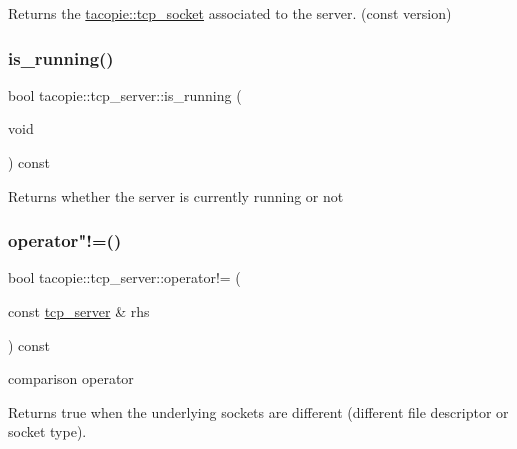 \begin{DoxyReturn}{Returns}
the \hyperlink{classtacopie_1_1tcp__socket}{tacopie\+::tcp\+\_\+socket} associated to the server. (const version) 
\end{DoxyReturn}
\mbox{\label{classtacopie_1_1tcp__server_a76162141e6443953f3ad8e11c4e4d3d7}} 
\subsubsection{\texorpdfstring{is\+\_\+running()}{is\_running()}}
{\footnotesize\ttfamily bool tacopie\+::tcp\+\_\+server\+::is\+\_\+running (\begin{DoxyParamCaption}\item[{void}]{ }\end{DoxyParamCaption}) const}

\begin{DoxyReturn}{Returns}
whether the server is currently running or not 
\end{DoxyReturn}
\mbox{\label{classtacopie_1_1tcp__server_aa45611b77d60b536aeaf626d1724342d}} 
\subsubsection{\texorpdfstring{operator"!=()}{operator!=()}}
{\footnotesize\ttfamily bool tacopie\+::tcp\+\_\+server\+::operator!= (\begin{DoxyParamCaption}\item[{const \hyperlink{classtacopie_1_1tcp__server}{tcp\+\_\+server} \&}]{rhs }\end{DoxyParamCaption}) const}

comparison operator

\begin{DoxyReturn}{Returns}
true when the underlying sockets are different (different file descriptor or socket type). 
\end{DoxyReturn}
\mbox{\label{classtacopie_1_1tcp__server_ab9b95a27afb405668bb4d5b1a312ceae}} 
